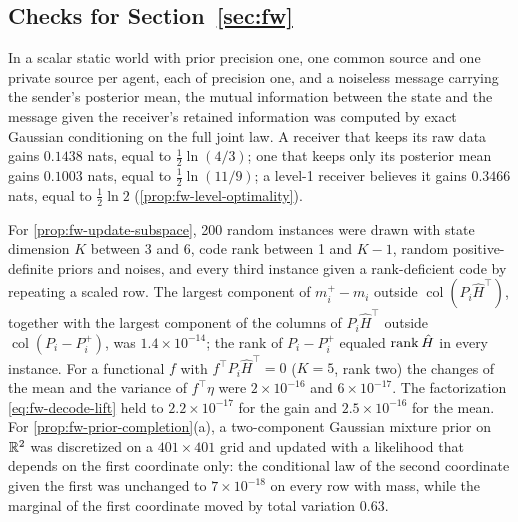 \subsection{Checks for \texorpdfstring{Section~\ref{sec:fw}}{the framework}}\label{chk:fw}

\begin{numcheck}\label{chk:fw-levels}
In a scalar static world with prior precision one, one common source and one private source per agent, each of precision one, and a noiseless message carrying the sender's posterior mean, the mutual information between the state and the message given the receiver's retained information was computed by exact Gaussian conditioning on the full joint law. A receiver that keeps its raw data gains $0.1438$ nats, equal to $\tfrac12\ln(4/3)$; one that keeps only its posterior mean gains $0.1003$ nats, equal to $\tfrac12\ln(11/9)$; a level-1 receiver believes it gains $0.3466$ nats, equal to $\tfrac12\ln2$ (\cref{prop:fw-level-optimality}).
\end{numcheck}

\begin{numcheck}\label{chk:fw-reception}
For \cref{prop:fw-update-subspace}, 200 random instances were drawn with state dimension $K$ between 3 and 6, code rank between 1 and $K-1$, random positive-definite priors and noises, and every third instance given a rank-deficient code by repeating a scaled row. The largest component of $m_i^+-m_i$ outside $\operatorname{col}(P_i\hat H^\top)$, together with the largest component of the columns of $P_i\hat H^\top$ outside $\operatorname{col}(P_i-P_i^+)$, was $1.4\times10^{-14}$; the rank of $P_i-P_i^+$ equaled $\operatorname{rank}\hat H$ in every instance. For a functional $f$ with $f^\top P_i\hat H^\top=0$ ($K=5$, rank two) the changes of the mean and the variance of $f^\top\eta$ were $2\times10^{-16}$ and $6\times10^{-17}$. The factorization \eqref{eq:fw-decode-lift} held to $2.2\times10^{-17}$ for the gain and $2.5\times10^{-16}$ for the mean. For \cref{prop:fw-prior-completion}(a), a two-component Gaussian mixture prior on $\mathbb{R}^2$ was discretized on a $401\times401$ grid and updated with a likelihood that depends on the first coordinate only: the conditional law of the second coordinate given the first was unchanged to $7\times10^{-18}$ on every row with mass, while the marginal of the first coordinate moved by total variation $0.63$.
\end{numcheck}

